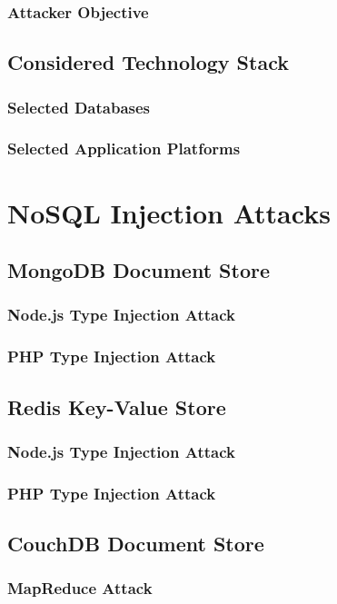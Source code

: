\subsection{Attacker Objective}



\section{Considered Technology Stack}
\subsection{Selected Databases}
\subsection{Selected Application Platforms}

\chapter{NoSQL Injection Attacks}

\section{MongoDB Document Store}
\subsection{Node.js Type Injection Attack}
\subsection{PHP Type Injection Attack}

\section{Redis Key-Value Store}
\subsection{Node.js Type Injection Attack}
\subsection{PHP Type Injection Attack}

\section{CouchDB Document Store}
\subsection{MapReduce Attack}